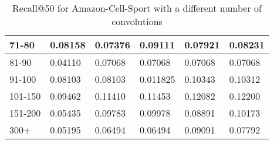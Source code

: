 \begin{table}[]
\begin{tabular}{|l|l|l|l|l|l|}
    71-80     & 0.08158                    & 0.07376                    & 0.09111                    & 0.07921                    & 0.08231                    \\ \hline
    81-90     & 0.04110                    & 0.07068                    & 0.07068                    & 0.07068                    & 0.07068                    \\ \hline
    91-100    & 0.08103                    & 0.08103                    & 0.011825                   & 0.10343                    & 0.10312                    \\ \hline
    101-150   & 0.09462                    & 0.11410                    & 0.11453                    & 0.12082                    & 0.12200                    \\ \hline
    151-200   & 0.05435                    & 0.09783                    & 0.09978                    & 0.08891                    & 0.10173                    \\ \hline
    300+      & 0.05195                    & 0.06494                    & 0.06494                    & 0.09091                    & 0.07792                    \\ \hline
    \end{tabular}
    \caption{Recall@50 for Amazon-Cell-Sport with a different number of convolutions}
    \label{tab:Amazon-Cell-Sport-recall-evaluation-mean}
\end{table}

